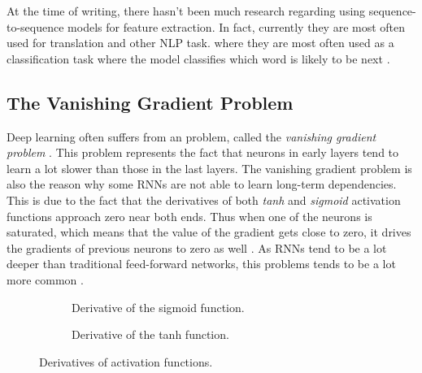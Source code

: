 At the time of writing, there hasn't been much research regarding using sequence-to-sequence models for feature extraction.
In fact, currently they are most often used for translation and other NLP task.
where they are most often used as a classification task where the model classifies which word is likely to be next \cite{tensorflowseq2seq,cho2014learning,rnnencoder,sutskever_vinyals_le}.

\subsection{The Vanishing Gradient Problem}

Deep learning often suffers from an problem, called the \textit{vanishing gradient problem} \cite{nielsen_2017}.
This problem represents the fact that neurons in early layers tend to learn a lot slower than those in the last layers.
The vanishing gradient problem is also the reason why some RNNs are not able to learn long-term dependencies.
This is due to the fact that the derivatives of both \textit{tanh} and \textit{sigmoid} activation functions approach zero near both ends.
Thus when one of the neurons is saturated, which means that the value of the gradient gets close to zero, it drives the gradients of previous neurons to zero as well \cite{britz_2016}.
As RNNs tend to be a lot deeper than traditional feed-forward networks, this problems tends to be a lot more common \cite{britz_2016}.

\begin{figure}[ht]
  \centering
  \begin{subfigure}[b]{0.45\textwidth}
    \centering
    \caption{Derivative of the sigmoid function.}
  \end{subfigure}
  \begin{subfigure}[b]{0.45\textwidth}
    \centering
    \caption{Derivative of the tanh function.}
  \end{subfigure}
  \caption{Derivatives of activation functions.}
\end{figure}

